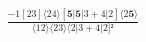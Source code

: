 \documentclass[varwidth, border=5pt]{standalone}
\begin{document}
\begin{my}
$\begin{gathered}
\scriptscriptstyle\frac{-1[23]⟨24⟩[𝟓|𝟓|3+4|2]⟨2𝟓⟩}{⟨12⟩⟨23⟩⟨2|3+4|2]²}
\end{gathered}$
\end{my}
\end{document}
